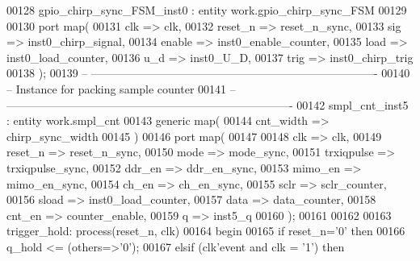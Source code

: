 \begin{DoxyCode}
00128 gpio\_chirp\_sync\_FSM\_inst0 : \textcolor{keywordflow}{entity} work.gpio_chirp_sync_FSM
00129 
00130     \textcolor{keywordflow}{port} \textcolor{keywordflow}{map}(
00131         clk               => clk,
00132       reset_n           => reset_n_sync,
00133       sig                   => inst0_chirp_signal,
00134         enable              => inst0_enable_counter,
00135         load                    => inst0_load_counter,
00136         u_d                 => inst0_U_D,
00137         trig                    => inst0_chirp_trig
00138         \textcolor{vhdlchar}{)};
00139 \textcolor{keyword}{-- ----------------------------------------------------------------------------}
00140 \textcolor{keyword}{-- Instance for packing sample counter}
00141 \textcolor{keyword}{-- ----------------------------------------------------------------------------        }
00142 smpl\_cnt\_inst5 : \textcolor{keywordflow}{entity} work.smpl_cnt
00143    \textcolor{keywordflow}{generic} \textcolor{keywordflow}{map}(
00144       cnt_width   => chirp_sync_width
00145    \textcolor{vhdlchar}{)}
00146    \textcolor{keywordflow}{port} \textcolor{keywordflow}{map}(
00147 
00148       clk         => clk,
00149       reset_n     => reset_n_sync,
00150       mode        => mode_sync,
00151       trxiqpulse  => trxiqpulse_sync,
00152       ddr_en      => ddr_en_sync,
00153       mimo_en     => mimo_en_sync,
00154       ch_en       => ch_en_sync,
00155       sclr        => sclr_counter,
00156       sload       => inst0_load_counter,
00157       data        => data_counter,
00158       cnt_en      => counter_enable,
00159       q           => inst5_q        
00160         \textcolor{vhdlchar}{)};
00161 
00162 
00163 trigger\_hold: \textcolor{keywordflow}{process}(reset_n, clk)
00164 \textcolor{vhdlkeyword}{begin}
00165     \textcolor{keywordflow}{if} \textcolor{vhdlchar}{reset_n}\textcolor{vhdlchar}{=}\textcolor{vhdlchar}{'}\textcolor{vhdllogic}{}\textcolor{vhdllogic}{0}\textcolor{vhdlchar}{'} \textcolor{keywordflow}{then}
00166         \textcolor{vhdlchar}{q_hold} \textcolor{vhdlchar}{<=} \textcolor{vhdlchar}{(}\textcolor{keywordflow}{others}\textcolor{vhdlchar}{=}\textcolor{vhdlchar}{>}\textcolor{vhdlchar}{'}\textcolor{vhdllogic}{}\textcolor{vhdllogic}{0}\textcolor{vhdlchar}{'}\textcolor{vhdlchar}{)};         
00167     \textcolor{keywordflow}{elsif} \textcolor{vhdlchar}{(}\textcolor{vhdlchar}{clk}\textcolor{vhdlchar}{'}\textcolor{vhdlkeyword}{event} \textcolor{keywordflow}{and} \textcolor{vhdlchar}{clk} \textcolor{vhdlchar}{=} \textcolor{vhdlchar}{'}\textcolor{vhdllogic}{}\textcolor{vhdllogic}{1}\textcolor{vhdlchar}{'}\textcolor{vhdlchar}{)} \textcolor{keywordflow}{then}

\end{DoxyCode}
